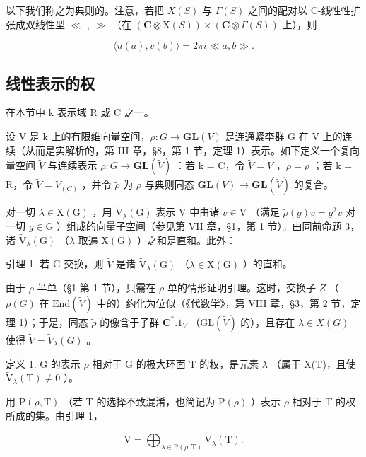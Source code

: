 以下我们称之为典则的。注意，若把 \(X(S)\) 与 \(\Gamma(S)\) 之间的配对以 C-线性性扩张成双线性型 \(\ll\) , \(\gg\) （在 \((\mathbf{C} \otimes \mathrm{X}(S)) \times (\mathbf{C} \otimes \Gamma(S))\) 上），则

\[
\langle u (a), v (b) \rangle = 2 \pi i \ll a, b \gg .
\]

\subsection{线性表示的权}

在本节中 k 表示域 R 或 C 之一。

设 V 是 k 上的有限维向量空间，\(\rho: G \to \mathbf{GL}(V)\) 是连通紧李群 G 在 V 上的连续（从而是实解析的，第 III 章，§8，第 1 节，定理 1）表示。如下定义一个复向量空间 \(\tilde{V}\) 与连续表示 \(\tilde{\rho}: G \to \mathbf{GL}(\tilde{V})\) ：若 k = C，令 \(\tilde{V} = V\) ，\(\tilde{\rho} = \rho\) ；若 k = R，令 \(\tilde{V} = V_{(C)}\) ，并令 \(\tilde{\rho}\) 为 \(\rho\) 与典则同态 \(\mathbf{GL}(V) \to \mathbf{GL}(\tilde{V})\) 的复合。

对一切 \(\lambda \in \mathrm{X}(\mathrm{G})\) ，用 \(\tilde{\mathrm{V}}_{\lambda}(\mathrm{G})\) 表示 \(\tilde{\mathrm{V}}\) 中由诸 \(v \in \tilde{\mathrm{V}}\) （满足 \(\tilde{\rho}(g)v = g^{\lambda}v\) 对一切 \(g \in \mathrm{G}\) ）组成的向量子空间（参见第 VII 章，§1，第 1 节）。由同前命题 3，诸 \(\tilde{\mathrm{V}}_{\lambda}(\mathrm{G})\) （\(\lambda\) 取遍 \(\mathrm{X}(\mathrm{G})\) ）之和是直和。此外：

引理 1. 若 G 交换，则 \(\tilde{V}\) 是诸 \(\tilde{\mathrm{V}}_{\lambda}(\mathrm{G})\) （\(\lambda \in \mathrm{X}(\mathrm{G})\) ）的直和。

由于 \(\rho\) 半单（§1 第 1 节），只需在 \(\rho\) 单的情形证明引理。这时，交换子 \(Z\) （\(\rho(G)\) 在 \(\mathrm{End}(\tilde{V})\) 中的）约化为位似（《代数学》，第 VIII 章，§3，第 2 节，定理 1）；于是，同态 \(\tilde{\rho}\) 的像含于子群 \(\mathbf{C}^*.1_V\) （\(\mathrm{GL}(\tilde{V})\) 的），且存在 \(\lambda \in X(G)\) 使得 \(\tilde{V} = \tilde{V}_{\lambda}(G)\) 。

定义 1. G 的表示 \(\rho\) 相对于 G 的极大环面 T 的权，是元素 \(\lambda\) （属于 X(T)，且使 \(\tilde{\mathrm{V}}_{\lambda}(\mathrm{T}) \neq 0\) ）。

用 \(\mathrm{P}(\rho,\mathrm{T})\) （若 T 的选择不致混淆，也简记为 \(\mathrm{P}(\rho)\) ）表示 \(\rho\) 相对于 T 的权所成的集。由引理 1，

\[
\tilde {\mathrm{V}} = \bigoplus_ {\lambda \in \mathrm{P} (\rho , \mathrm{T})} \tilde {\mathrm{V}} _ {\lambda} (\mathrm{T}).\tag{7}
\]

